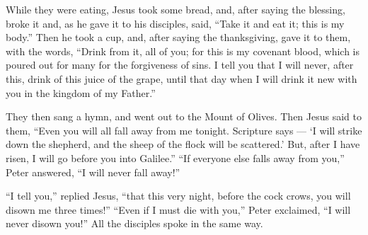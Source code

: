  While they were eating, Jesus took some bread, and, after
saying the blessing, broke it and, as he gave it to his disciples, said,
``Take it and eat it; this is my body.''  Then he took a
cup, and, after saying the thanksgiving, gave it to them, with the
words, ``Drink from it, all of you;  for this is my
covenant blood, which is poured out for many for the forgiveness of
sins.  I tell you that I will never, after this, drink of
this juice of the grape, until that day when I will drink it new with
you in the kingdom of my Father.''

 They then sang a hymn, and went out to the Mount of
Olives.  Then Jesus said to them, ``Even you will all fall
away from me tonight. Scripture says --- `I will strike down the
shepherd, and the sheep of the flock will be scattered.' 
But, after I have risen, I will go before you into Galilee.''
 ``If everyone else falls away from you,'' Peter answered,
``I will never fall away!''

 ``I tell you,'' replied Jesus, ``that this very night,
before the cock crows, you will disown me three times!'' 
``Even if I must die with you,'' Peter exclaimed, ``I will never disown
you!'' All the disciples spoke in the same way.

